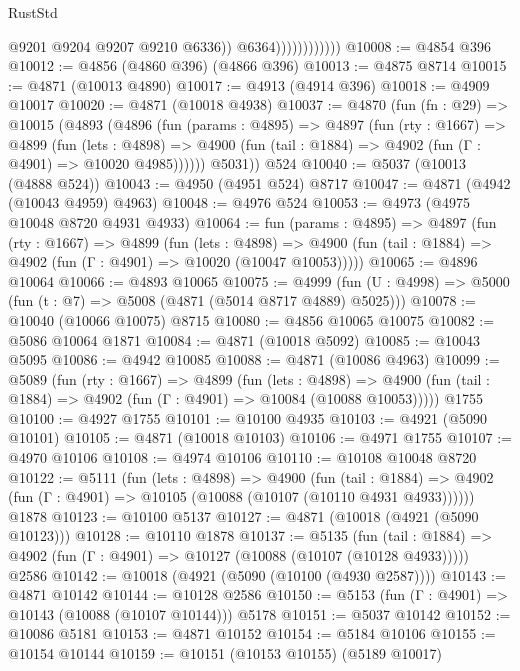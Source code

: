 \begin{lexlean}{RustStd}
\begin{coremodule}
{\begin{coremodule}
{{{{{{{{{{{{{{{{{{{{{{{{{{{{{                                @9201
                                @9204
                                @9207
                                @9210
                                @6336))
                            @6364))))))))))))
@10008 := @4854 @396
@10012 := @4856 (@4860 @396) (@4866 @396)
@10013 := @4875 @8714
@10015 := @4871 (@10013 @4890)
@10017 := @4913 (@4914 @396)
@10018 := @4909 @10017
@10020 := @4871 (@10018 @4938)
@10037 := @4870
    (fun (fn : @29) =>
    @10015
      (@4893
        (@4896
          (fun (params : @4895) =>
          @4897
            (fun (rty : @1667) =>
            @4899
              (fun (lets : @4898) =>
              @4900 (fun (tail : @1884) => @4902 (fun (Γ : @4901) => @10020 @4985))))))
        @5031))
    @524
@10040 := @5037 (@10013 (@4888 @524))
@10043 := @4950 (@4951 @524) @8717
@10047 := @4871 (@4942 (@10043 @4959) @4963)
@10048 := @4976 @524
@10053 := @4973 (@4975 @10048 @8720 @4931 @4933)
@10064 := fun (params : @4895) =>
  @4897
    (fun (rty : @1667) =>
    @4899
      (fun (lets : @4898) =>
      @4900 (fun (tail : @1884) => @4902 (fun (Γ : @4901) => @10020 (@10047 @10053)))))
@10065 := @4896 @10064
@10066 := @4893 @10065
@10075 := @4999 (fun (U : @4998) => @5000 (fun (t : @7) => @5008 (@4871 (@5014 @8717 @4889) @5025)))
@10078 := @10040 (@10066 @10075) @8715
@10080 := @4856 @10065 @10075
@10082 := @5086 @10064 @1871
@10084 := @4871 (@10018 @5092)
@10085 := @10043 @5095
@10086 := @4942 @10085
@10088 := @4871 (@10086 @4963)
@10099 := @5089
    (fun (rty : @1667) =>
    @4899
      (fun (lets : @4898) =>
      @4900 (fun (tail : @1884) => @4902 (fun (Γ : @4901) => @10084 (@10088 @10053)))))
    @1755
@10100 := @4927 @1755
@10101 := @10100 @4935
@10103 := @4921 (@5090 @10101)
@10105 := @4871 (@10018 @10103)
@10106 := @4971 @1755
@10107 := @4970 @10106
@10108 := @4974 @10106
@10110 := @10108 @10048 @8720
@10122 := @5111
    (fun (lets : @4898) =>
    @4900
      (fun (tail : @1884) =>
      @4902 (fun (Γ : @4901) => @10105 (@10088 (@10107 (@10110 @4931 @4933))))))
    @1878
@10123 := @10100 @5137
@10127 := @4871 (@10018 (@4921 (@5090 @10123)))
@10128 := @10110 @1878
@10137 := @5135
    (fun (tail : @1884) => @4902 (fun (Γ : @4901) => @10127 (@10088 (@10107 (@10128 @4933)))))
    @2586
@10142 := @10018 (@4921 (@5090 (@10100 (@4930 @2587))))
@10143 := @4871 @10142
@10144 := @10128 @2586
@10150 := @5153 (fun (Γ : @4901) => @10143 (@10088 (@10107 @10144))) @5178
@10151 := @5037 @10142
@10152 := @10086 @5181
@10153 := @4871 @10152
@10154 := @5184 @10106
@10155 := @10154 @10144
@10159 := @10151 (@10153 @10155) (@5189 @10017)
}}}}}}}}}}}}}}}}}}}}}}}}}}}}}
\end{coremodule}}
\end{coremodule}
\end{lexlean}
